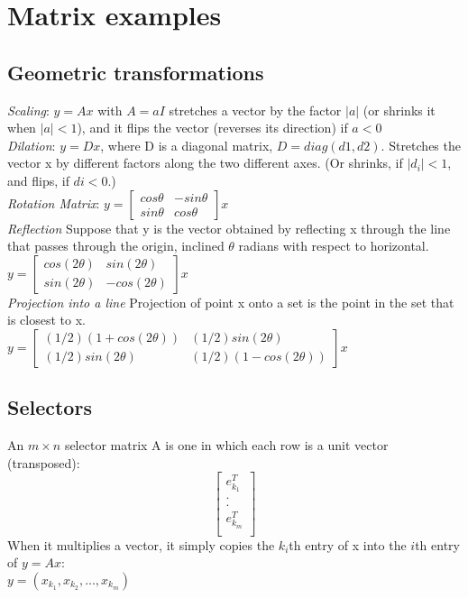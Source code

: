 \section{Matrix examples}
\subsection{Geometric transformations}
\textbullet \textit{Scaling}: $y = Ax$ with $A = aI$ stretches a vector by the factor $|a|$ (or shrinks it when $|a| < 1$), and it flips the vector (reverses its direction) if $a < 0$\\
\textbullet \textit{Dilation}: $y = Dx$, where D is a diagonal matrix, $D = diag(d1,d2)$. Stretches the vector x by different factors along the two different axes. (Or shrinks, if $|d_i| < 1$, and flips, if $di < 0$.)\\
\textbullet \textit{Rotation Matrix}: 
$
y = 
\begin{bmatrix}
    cos \theta & -sin \theta \\
    sin \theta & cos \theta
\end{bmatrix}x
$\\
\textbullet \textit{Reflection}
Suppose that y is the vector obtained by reflecting x through the line that passes through the origin, inclined $\theta$ radians with respect to horizontal.\\
$
y = 
\begin{bmatrix}
    cos (2\theta) & sin(2\theta) \\
    sin (2\theta) & -cos (2\theta)
\end{bmatrix}x
$\\
\textbullet \textit{Projection into a line}
Projection of point x onto a set is the point in the set that is closest to x.\\
$
y = 
\begin{bmatrix}
    (1/2)(1 + cos (2\theta)) & (1/2)sin(2\theta) \\
    (1/2)sin (2\theta) & (1/2)(1 - cos (2\theta))
\end{bmatrix}x
$
\subsection{Selectors}
An $m \times n$ selector matrix A is one in which each row is a unit vector (transposed):
\[
\begin{bmatrix}
    e^T_{k_1}\\
    .\\
    .\\
    e^T_{k_m}\\
\end{bmatrix}
\]
When it multiplies a vector, it simply copies the $k_i$th entry of x into the $i$th entry of $y = Ax$:\\
$y = (x_{k_1},x_{k_2},...,x_{k_m})$\\


